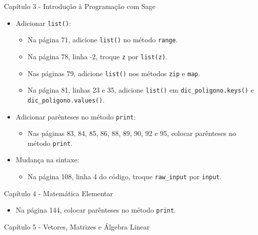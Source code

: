 \documentclass[10pt,a4paper]{report}
\begin{document}
\vspace{1cm}
\noindent
{ \large Capítulo 3 - Introdução à Programação com Sage}
\begin{itemize}
 \item Adicionar \verb|list()|:
 \begin{itemize}
 \item Na página 71, adicione \verb|list()| no método \verb|range|. 
 
 
 \item Na página 78, linha -2, troque \verb|z| por \verb|list(z)|.
 
 \item Nas páginas 79, adicione \verb|list()| nos métodos \verb|zip| e \verb|map|.
 
 \item Na página 81, linhas 23 e 35, adicione \verb|list()| em \verb|dic_poligono.keys()| e \verb|dic_poligono.values()|.
 \end{itemize}


 
 \item Adicionar parênteses no método \verb|print|:
 \begin{itemize}
  
\item Nas páginas 83, 84, 85, 86, 88, 89, 90, 92 e 95, colocar parênteses no método \verb|print|.
 \end{itemize}
 
 
 
 \item Mudança na sintaxe:
\begin{itemize}
 \item Na página 108, linha 4 do código, troque \verb|raw_input| por \verb|input|.
\end{itemize}

\end{itemize}

\vspace{1cm}

\noindent
{\large Capítulo 4 - Matemática Elementar}

\begin{itemize}
 \item Na página 144,  colocar parênteses no método \verb|print|.
\end{itemize}



\vspace{1cm}
\noindent
{\large Capítulo 5 - Vetores, Matrizes e Álgebra Linear}
\end{document}
